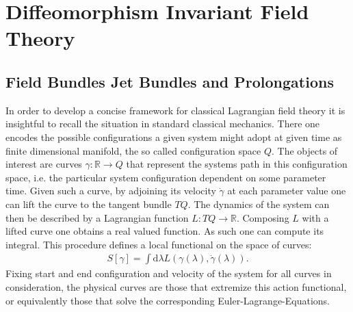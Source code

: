\documentclass[a4paper,12pt, DIV=14, BCOR=5mm, twoside, headsepline]{scrbook}
\begin{document}
\chapter{Diffeomorphism Invariant Field Theory}


\section{Field Bundles Jet Bundles and Prolongations}
In order to develop a concise framework for classical Lagrangian field theory it is insightful to recall the situation in standard classical mechanics. There one encodes the possible configurations a given system might adopt at given time as finite dimensional manifold, the so called configuration space $Q$. The objects of interest are curves $\gamma : \mathbb{R} \rightarrow Q $ that represent the systems path in this configuration space, i.e. the particular system configuration dependent on some parameter time. Given such a curve, by adjoining its velocity $\dot{\gamma}$ at each parameter value one can lift the curve to the tangent bundle $TQ$. The dynamics of the system can then be described by a Lagrangian function $L : TQ \rightarrow \mathbb{R}$. Composing $L$ with a lifted curve one obtains a real valued function. As such one can compute its integral. This procedure defines a local functional on the space of curves:
\begin{align}
S[\gamma] = \int \mathrm{d}\lambda L(\gamma (\lambda), \dot{\gamma} (\lambda)).  
\end{align}
Fixing start and end configuration and velocity of the system for all curves in consideration, the physical curves are those that extremize this action functional, or equivalently those that solve the corresponding Euler-Lagrange-Equations. \\

\end{document}
